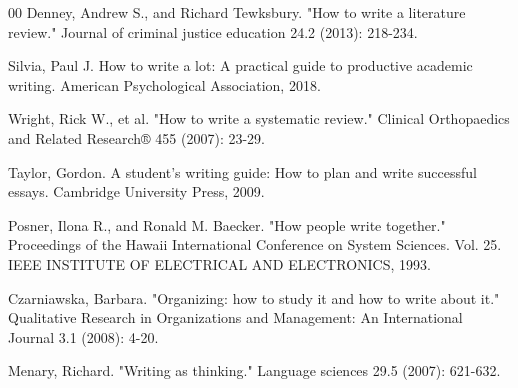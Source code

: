 \begin{thebibliography}{00}
 Denney, Andrew S., and Richard Tewksbury. "How to write a literature review." Journal of criminal justice education 24.2 (2013): 218-234.

 Silvia, Paul J. How to write a lot: A practical guide to productive academic writing. American Psychological Association, 2018.

 Wright, Rick W., et al. "How to write a systematic review." Clinical Orthopaedics and Related Research® 455 (2007): 23-29.

 Taylor, Gordon. A student's writing guide: How to plan and write successful essays. Cambridge University Press, 2009.

 Posner, Ilona R., and Ronald M. Baecker. "How people write together." Proceedings of the Hawaii International Conference on System Sciences. Vol. 25. IEEE INSTITUTE OF ELECTRICAL AND ELECTRONICS, 1993.

 Czarniawska, Barbara. "Organizing: how to study it and how to write about it." Qualitative Research in Organizations and Management: An International Journal 3.1 (2008): 4-20.

 Menary, Richard. "Writing as thinking." Language sciences 29.5 (2007): 621-632.


\end{thebibliography}